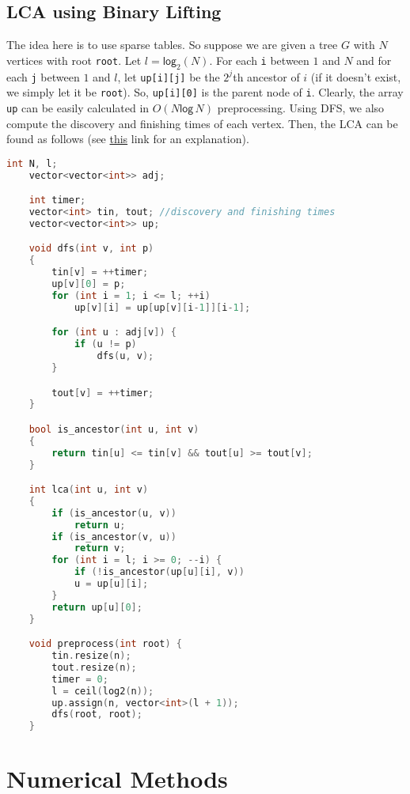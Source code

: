 \documentclass[12pt,a4paper]{amsart}
\numberwithin{equation}{section}
\theoremstyle{definition}
\begin{document}
\subsection{LCA using Binary Lifting} The idea here is to use sparse tables. So suppose we are given a tree $G$ with $N$ vertices with root \verb|root|. Let $l = \mathsf{log}_2(N)$. For each \verb|i| between $1$ and $N$ and for each \verb|j| between $1$ and $l$, let \verb|up[i][j]| be the $2^{j}$th ancestor of $i$ (if it doesn't exist, we simply let it be \verb|root|). So, \verb|up[i][0]| is the parent node of \verb|i|. Clearly, the array \verb|up| can be easily calculated in $O(N\mathsf{log\,}N)$ preprocessing. Using DFS, we also compute the discovery and finishing times of each vertex. Then, the LCA can be found as follows (see \href{https://cp-algorithms.com/graph/lca_binary_lifting.html}{this} link for an explanation).

\begin{lstlisting}[language=C++]
    int N, l;
    vector<vector<int>> adj;

    int timer;
    vector<int> tin, tout; //discovery and finishing times
    vector<vector<int>> up;

    void dfs(int v, int p)
    {
        tin[v] = ++timer;
        up[v][0] = p; 
        for (int i = 1; i <= l; ++i)
            up[v][i] = up[up[v][i-1]][i-1];

        for (int u : adj[v]) {
            if (u != p)
                dfs(u, v);
        }

        tout[v] = ++timer;
    }

    bool is_ancestor(int u, int v)
    {
        return tin[u] <= tin[v] && tout[u] >= tout[v];
    }

    int lca(int u, int v)
    {
        if (is_ancestor(u, v))
            return u;
        if (is_ancestor(v, u))
            return v;
        for (int i = l; i >= 0; --i) {
            if (!is_ancestor(up[u][i], v))
            u = up[u][i];
        }
        return up[u][0];
    }

    void preprocess(int root) {
        tin.resize(n);
        tout.resize(n);
        timer = 0;
        l = ceil(log2(n));
        up.assign(n, vector<int>(l + 1));
        dfs(root, root);
    }
\end{lstlisting}

\section{Numerical Methods}
\end{document}
